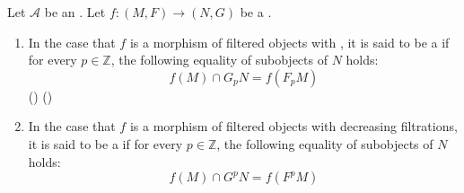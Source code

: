 \begin{definition} \label{definition:strict_morphism_of_filtered_objects_in_an_abelian_category}
Let $\mathcal{A}$ be an . Let $f: (M, F) \to (N, G)$ be a .
\begin{enumerate}
    \item In the case that $f$ is a morphism of filtered objects with , it is said to be a  if for every $p \in \mathbb{Z}$, the following equality of subobjects of $N$ holds:
    $$f(M) \cap G_p N = f(F_p M)$$
    () ()

    \item In the case that $f$ is a morphism of filtered objects with decreasing filtrations, it is said to be a  if for every $p \in \mathbb{Z}$, the following equality of subobjects of $N$ holds:
    $$f(M) \cap G^p N = f(F^p M)$$
\end{enumerate}
\end{definition}